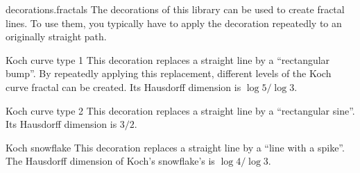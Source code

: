 \begin{pgflibrary}{decorations.fractals}
    The decorations of this library can be used to create fractal lines. To use
    them, you typically have to apply the decoration repeatedly to an
    originally straight path.
\end{pgflibrary}

\begin{decoration}{Koch curve type 1}
    This decoration replaces a straight line by a ``rectangular bump''. By
    repeatedly applying this replacement, different levels of the Koch curve
    fractal can be created. Its Hausdorff dimension is $\log 5/\log 3$.
\begin{codeexample}[]
\end{codeexample}
\end{decoration}

\begin{decoration}{Koch curve type 2}
    This decoration replaces a straight line by a ``rectangular sine''. Its
    Hausdorff dimension is $3/2$.
\begin{codeexample}[]
\end{codeexample}
\end{decoration}

\begin{decoration}{Koch snowflake}
    This decoration replaces a straight line by a ``line with a spike''. The
    Hausdorff dimension of Koch's snowflake's is $\log 4/\log 3$.
\begin{codeexample}[]
\end{codeexample}
\end{decoration}

